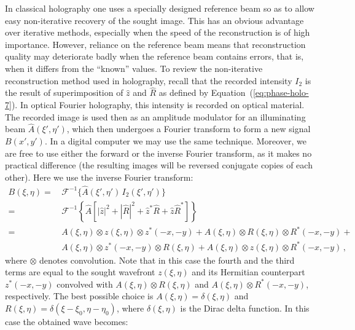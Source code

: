 In classical holography one uses a specially designed reference
beam so as to allow easy non-iterative recovery of the sought
image. This has an obvious advantage over iterative methods,
especially when the speed of the reconstruction is of high
importance. However, reliance on the reference beam means that
reconstruction quality may deteriorate badly when the reference
beam contains errors, that is, when it differs from the ``known''
values. To review the non-iterative reconstruction method used in
holography, recall that the recorded intensity $I_{2}$ is the
result of superimposition of $\hat{z}$ and $\hat{R}$ as defined by
Equation~(\ref{eq:phase-holo-7}). In optical Fourier holography, this
intensity is recorded on optical material. The recorded image is
used then as an amplitude modulator for an illuminating beam
$\hat{A}(\xi',\eta')$, which then undergoes a Fourier transform to
form a new signal $B(x',y')$. In a digital computer we may use the
same technique. Moreover, we are free to use either the forward or
the inverse Fourier transform, as it makes no practical difference
(the resulting images will be reversed conjugate copies of each
other). Here we use the inverse Fourier transform:
\begin{equation}
  \label{eq:phase-holo-14}
  \begin{aligned}
    B(\xi,\eta)
    =&\,  \mathcal{F}^{-1}\{\hat{A}(\xi',\eta')\,I_{2}(\xi',\eta')\}\\
    =&\,   \mathcal{F}^{-1}
    \left\{
      \hat{A}
      \left[
        |\hat{z}|^{2} + |\hat{R}|^{2}
        + \hat{z}^{*}\hat{R} + \hat{z}\hat{R}^{*}
      \right]
    \right\}\\
    = &\,  
    A(\xi,\eta) \otimes z(\xi,\eta) \otimes z^{*}(-x,-y) +
    A(\xi,\eta) \otimes R(\xi,\eta) \otimes R^{*}(-x,-y) +\\
    &\,
    A(\xi,\eta) \otimes z^{*}(-x,-y) \otimes R(\xi,\eta) +
    A(\xi,\eta) \otimes z(\xi,\eta) \otimes R^{*}(-x,-y) \, ,
  \end{aligned}
\end{equation}
where $\otimes$ denotes convolution. Note that in this case the
fourth and the third terms are equal to the sought wavefront
$z(\xi,\eta)$ and its Hermitian counterpart $z^{*}(-x,-y)$ convolved
with $A(\xi,\eta)\otimes R(\xi,\eta)$ and $A(\xi,\eta)\otimes R^{*}(-x,-y)$,
respectively.  The best possible choice is $A(\xi,\eta) = \delta(\xi,\eta)$
and $R(\xi,\eta)= \delta(\xi-\xi_{0},\eta-\eta_{0})$, where $\delta(\xi,\eta)$ is the
Dirac delta function.  In this case the obtained wave becomes:
